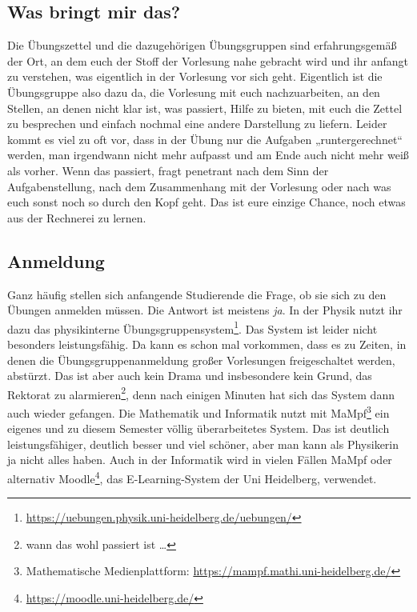 \subsection{Was bringt mir das?}
Die Übungszettel und die dazugehörigen Übungsgruppen sind erfahrungsgemäß der Ort, an dem euch der Stoff der Vorlesung nahe gebracht wird und ihr anfangt zu verstehen, was eigentlich in der Vorlesung vor sich geht. Eigentlich ist die Übungsgruppe also dazu da, die Vorlesung mit euch nachzuarbeiten, an den Stellen, an denen nicht klar ist, was passiert, Hilfe zu bieten, mit euch die Zettel zu besprechen und einfach nochmal eine andere Darstellung zu liefern. Leider kommt es viel zu oft vor, dass in der Übung nur die Aufgaben „runtergerechnet“ werden, man irgendwann nicht mehr aufpasst und am Ende auch nicht mehr weiß als vorher. Wenn das passiert, fragt penetrant nach dem Sinn der Aufgabenstellung, nach dem Zusammenhang mit der Vorlesung oder nach was euch sonst noch so durch den Kopf geht. Das ist eure einzige Chance, noch etwas aus der Rechnerei zu lernen.

\subsection{Anmeldung}
Ganz häufig stellen sich anfangende Studierende die Frage, ob sie sich zu den Übungen anmelden müssen. Die Antwort ist meistens \emph{ja}. In der Physik nutzt ihr dazu das physikinterne Übungsgruppensystem\footnote{\url{https://uebungen.physik.uni-heidelberg.de/uebungen/}}. Das System ist leider nicht besonders leistungsfähig. Da kann es schon mal vorkommen, dass es zu Zeiten, in denen die Übungsgruppenanmeldung großer Vorlesungen freigeschaltet werden, abstürzt. Das ist aber auch kein Drama und insbesondere kein Grund, das Rektorat zu alarmieren\footnote{wann das wohl passiert ist \dots}, denn nach einigen Minuten hat sich das System dann auch wieder gefangen. 
Die Mathematik und Informatik nutzt mit MaMpf\footnote{Mathematische Medienplattform: \url{https://mampf.mathi.uni-heidelberg.de/}} ein eigenes und zu diesem Semester völlig überarbeitetes System. Das ist deutlich leistungsfähiger, deutlich besser und viel schöner, aber man kann als Physikerin ja nicht alles haben. Auch in der Informatik wird in vielen Fällen MaMpf oder alternativ Moodle\footnote{\url{https://moodle.uni-heidelberg.de/}}, das E-Learning-System der Uni Heidelberg, verwendet.


